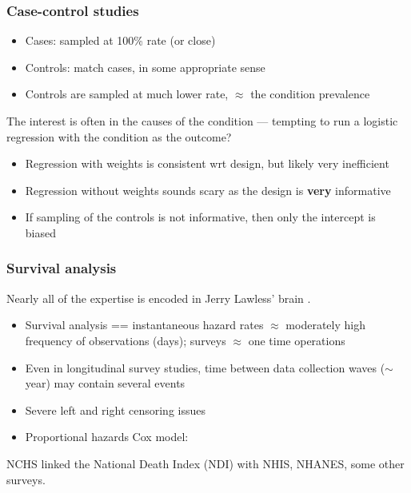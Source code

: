 \documentclass{beamer}
\begin{document}
\begin{frame}\frametitle{Case-control studies}

\begin{itemize}
    \item Cases: sampled at 100\% rate (or close)
    \item Controls: match cases, in some appropriate sense
    \item Controls are sampled at much lower rate, $\approx$ the condition prevalence
\end{itemize}

The interest is often in the causes of the condition --- tempting to run a logistic
regression with the condition as the outcome?

\begin{itemize}
    \item Regression with weights is consistent wrt design, but likely very inefficient
    \item Regression without weights sounds scary as the design is \textbf{very} informative
    \item If sampling of the controls is not informative, then only the intercept is biased
        \citep{scott:wild:2003}
\end{itemize}

\end{frame}

\begin{frame}\frametitle{Survival analysis}

Nearly all of the expertise is encoded in Jerry Lawless' brain
\citep{lawless:2003}.

\begin{itemize}
    \item Survival analysis == instantaneous hazard rates
            $\approx$ moderately high frequency
            of observations (days); surveys $\approx$ one time operations
    \item Even in longitudinal survey studies, time between data collection
          waves ($\sim$year) may contain several events
    \item Severe left and right censoring issues
    \item Proportional hazards Cox model: \citet{binder:1992}
\end{itemize}

NCHS linked the National Death Index (NDI) with NHIS, NHANES,
some other surveys.

\end{frame}
\end{document}
